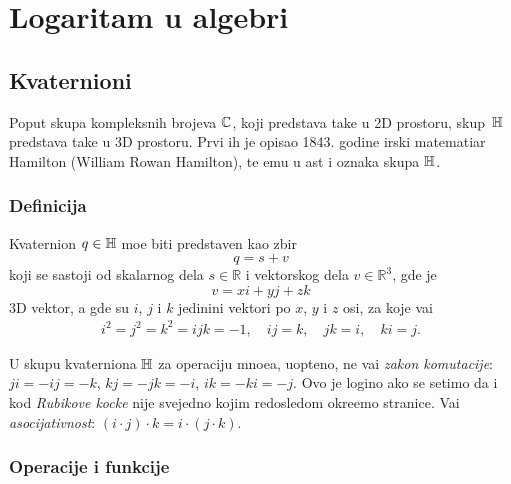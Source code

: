 

\section{Logaritam u algebri}

\subsection{Kvaternioni}

\def\uv{{\hat u}}
\def\vp{{\vec v}}
\def\norm#1{{\Vert#1\Vert}}

Poput skupa kompleksnih brojeva ${\mathbb C}$, koji predstav{\lj}a ta{\cv}ke u 2D prostoru,
skup~${\mathbb H}$ predstav{\lj}a ta{\cv}ke u 3D prostoru. Prvi ih je opisao 
1843. godine irski ma\-te\-ma\-ti\-{\cv}ar
Hamilton (William Rowan Hamilton), te {\nj}emu u {\cv}ast i oznaka skupa ${\mathbb H}$.

\subsubsection{Definicija}

Kvaternion $q\in{\mathbb H}$ mo{\zv}e biti predstav{\lj}en kao zbir
\begin{equation}
    q=s+v
\end{equation}
koji se sastoji od skalarnog dela $s\in{\mathbb R}$ i vektorskog dela $v\in{\mathbb R}^3$, gde je
\begin{equation}
    v=xi+yj+zk
\end{equation}
3D vektor, a gde su $i$, $j$ i $k$ jedini{\cv}ni vektori po $x$, $y$ i $z$ osi,
za koje va{\zv}i
\begin{gather}    
    i^2=j^2=k^2=ijk=-1,\quad
    ij=k,\quad jk=i,\quad ki=j. 
\end{gather}

\danger U skupu kvaterniona ${\mathbb H}$ za operaciju mno{\zv}e{\nj}a, uop{\sv}teno, ne va{\zv}i {\sl zakon komutacije}:
$ji=-ij=-k$, $kj=-jk=-i$, $ik=-ki=-j$.
Ovo je logi{\cv}no ako se setimo da i kod
{\sl Rubikove kocke\/} nije svejedno kojim redosledom okre{\cc}emo stranice.
Va{\zv}i {\sl asocijativnost}: $(i\cdot j)\cdot k=i\cdot(j\cdot k)$.

\subsubsection{Operacije i funkcije}

